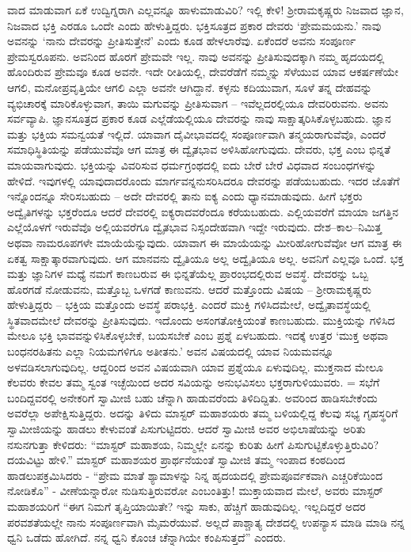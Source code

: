 ವಾದ ಮಾಡುವಾಗ ಏಕೆ ಉದ್ವಿಗ್ನರಾಗಿ ಎಲ್ಲವನ್ನೂ ಹಾಳುಮಾಡುವಿರಿ? ಇಲ್ಲಿ ಕೇಳಿ! ಶ‍್ರೀರಾಮಕೃಷ್ಣರು ನಿಜವಾದ ಜ್ಞಾನ, ನಿಜವಾದ ಭಕ್ತಿ ಎರಡೂ ಒಂದೇ ಎಂದು ಹೇಳುತ್ತಿದ್ದರು. ಭಕ್ತಿಸೂತ್ರದ ಪ್ರಕಾರ ದೇವರು ‘ಪ್ರೇಮಮಯನು.’ ನಾವು ಅವನನ್ನು ‘ನಾನು ದೇವರನ್ನು ಪ್ರೀತಿಸುತ್ತೇನೆ’ ಎಂದು ಕೂಡ ಹೇಳಲಾರೆವು. ಏಕೆಂದರೆ ಅವನು ಸಂಪೂರ್ಣ ಪ್ರೇಮಸ್ವರೂಪನು. ಅವನಿಂದ ಹೊರಗೆ ಪ್ರೇಮವೇ ಇಲ್ಲ. ನಾವು ಅವನನ್ನು ಪ್ರೀತಿಸುವುದಕ್ಕಾಗಿ ನಮ್ಮ ಹೃದಯದಲ್ಲಿ ಹೊಂದಿರುವ ಪ್ರೇಮವೂ ಕೂಡ ಅವನೇ. ಇದೇ ರೀತಿಯಲ್ಲಿ, ದೇವರೆಡೆಗೆ ನಮ್ಮನ್ನು ಸೆಳೆಯುವ ಯಾವ ಆಕರ್ಷಣೆಯೇ ಆಗಲಿ, ಮನೋಪ್ರವೃತ್ತಿಯೇ ಆಗಲಿ ಎಲ್ಲಾ ಅವನೇ ಆಗಿದ್ದಾನೆ. ಕಳ್ಳನು ಕದಿಯುವಾಗ, ಸೂಳೆ ತನ್ನ ದೇಹವನ್ನು ವ್ಯಭಿಚಾರಕ್ಕೆ ಮಾರಿಕೊಳ್ಳುವಾಗ, ತಾಯಿ ಮಗುವನ್ನು ಪ್ರೀತಿಸುವಾಗ – ಇವೆಲ್ಲದರಲ್ಲಿಯೂ ದೇವರಿರುವನು. ಅವನು ಸರ್ವವ್ಯಾಪಿ. ಜ್ಞಾನಸೂತ್ರದ ಪ್ರಕಾರ ಕೂಡ ಎಲ್ಲೆಡೆಯಲ್ಲಿಯೂ ದೇವರನ್ನು ನಾವು ಸಾಕ್ಷಾತ್ಕರಿಸಿಕೊಳ್ಳಬಹುದು. ಜ್ಞಾನ ಮತ್ತು ಭಕ್ತಿಯ ಸಮನ್ವಯತೆ ಇಲ್ಲಿದೆ. ಯಾವಾಗ ದೈವೀಭಾವದಲ್ಲಿ ಸಂಪೂರ್ಣವಾಗಿ ತನ್ಮಯರಾಗುವೆವೊ, ಎಂದರೆ ಸಮಾಧಿಸ್ಥಿತಿಯನ್ನು ಪಡೆಯುವೆವೊ ಆಗ ಮಾತ್ರ ಈ ದ್ವೈತಭಾವ ಅಳಿಸಿಹೋಗುವುದು. ದೇವರು, ಭಕ್ತ ಎಂಬ ಭಿನ್ನತೆ ಮಾಯವಾಗುವುದು. ಭಕ್ತಿಯನ್ನು ವಿವರಿಸುವ ಧರ್ಮಗ್ರಂಥದಲ್ಲಿ ಐದು ಬೇರೆ ಬೇರೆ ವಿಧವಾದ ಸಂಬಂಧಗಳನ್ನು ಹೇಳಿದೆ. ಇವುಗಳಲ್ಲಿ ಯಾವುದಾದರೊಂದು ಮಾರ್ಗವನ್ನನುಸರಿಸಿದರೂ ದೇವರನ್ನು ಪಡೆಯಬಹುದು. ಇದರ ಜೊತೆಗೆ ಇನ್ನೊಂದನ್ನೂ ಸೇರಿಸಬಹುದು – ಅದೇ ದೇವರಲ್ಲಿ ತಾನು ಐಕ್ಯ ಎಂದು ಧ್ಯಾನಮಾಡುವುದು. ಹೀಗೆ ಭಕ್ತರು ಅದ್ವೈತಿಗಳನ್ನು ಭಕ್ತರೆಂದೂ ಆದರೆ ದೇವರಲ್ಲಿ ಐಕ್ಯರಾದವರೆಂದೂ ಕರೆಯಬಹುದು. ಎಲ್ಲಿಯವರೆಗೆ ಮಾಯಾ ಜಗತ್ತಿನ ಎಲ್ಲೆಯೊಳಗೆ ಇರುವೆವೊ ಅಲ್ಲಿಯವರೆಗೂ ದ್ವೈತಭಾವ ನಿಸ್ಸಂದೇಹವಾಗಿ ಇದ್ದೇ ಇರುವುದು. ದೇಶ–ಕಾಲ–ನಿಮಿತ್ತ ಅಥವಾ ನಾಮರೂಪಗಳೇ ಮಾಯೆಯೆನ್ನುವುದು. ಯಾವಾಗ ಈ ಮಾಯೆಯನ್ನು ಮೀರಿಹೋಗುವೆವೋ ಆಗ ಮಾತ್ರ ಈ ಏಕತ್ವ ಸಾಕ್ಷಾತ್ಕಾರವಾಗುವುದು. ಆಗ ಮಾನವನು ದ್ವೈತಿಯೂ ಅಲ್ಲ ಅದ್ವೈತಿಯೂ ಅಲ್ಲ. ಅವನಿಗೆ ಎಲ್ಲವೂ ಒಂದೆ. ಭಕ್ತ ಮತ್ತು ಜ್ಞಾನಿಗಳ ಮಧ್ಯೆ ನಮಗೆ ಕಾಣಬರುವ ಈ ಭಿನ್ನತೆಯೆಲ್ಲ ಪ್ರಾರಂಭದಲ್ಲಿರುವ ಅವಸ್ಥೆ. ದೇವರನ್ನು ಒಬ್ಬ ಹೊರಗಡೆ ನೋಡುವನು, ಮತ್ತೊಬ್ಬ ಒಳಗಡೆ ಕಾಣುವನು. ಆದರೆ ಮತ್ತೊಂದು ವಿಷಯ – ಶ‍್ರೀರಾಮಕೃಷ್ಣರು ಹೇಳುತ್ತಿದ್ದರು – ಭಕ್ತಿಯ ಮತ್ತೊಂದು ಅವಸ್ಥೆ ಪರಾಭಕ್ತಿ. ಎಂದರೆ ಮುಕ್ತಿ ಗಳಿಸಿದಮೇಲೆ, ಅದ್ವೈತಾವಸ್ಥೆಯಲ್ಲಿ ಸ್ಥಿತವಾದಮೇಲೆ ದೇವರನ್ನು ಪ್ರೀತಿಸುವುದು. ಇದೊಂದು ಅಸಂಗತೋಕ್ತಿಯಂತೆ ಕಾಣಬಹುದು. ಮುಕ್ತಿಯನ್ನು ಗಳಿಸಿದ ಮೇಲೂ ಭಕ್ತಿ ಭಾವವನ್ನುಳಿಸಿಕೊಳ್ಳಬೇಕೆ, ಬಯಸಬೇಕೆ ಎಂಬ ಪ್ರಶ್ನೆ ಏಳಬಹುದು. ಇದಕ್ಕೆ ಉತ್ತರ ‘ಮುಕ್ತ ಅಥವಾ ಬಂಧನರಹಿತನು ಎಲ್ಲಾ ನಿಯಮಗಳಿಗೂ ಅತೀತನು.’ ಅವನ ವಿಷಯದಲ್ಲಿ ಯಾವ ನಿಯಮವನ್ನೂ ಅಳವಡಿಸಲಾಗುವುದಿಲ್ಲ. ಆದ್ದರಿಂದ ಅವನ ವಿಷಯವಾಗಿ ಯಾವ ಪ್ರಶ್ನೆಯೂ ಏಳುವುದಿಲ್ಲ. ಮುಕ್ತನಾದ ಮೇಲೂ ಕೆಲವರು ಕೇವಲ ತಮ್ಮ ಸ್ವಂತ ಇಚ್ಛೆಯಿಂದ ಅದರ ಸವಿಯನ್ನು ಅನುಭವಿಸಲು ಭಕ್ತರಾಗುಳಿಯುವರು.
=
ಸಭೆಗೆ ಬಂದಿದ್ದವರಲ್ಲಿ ಅನೇಕರಿಗೆ ಸ್ವಾಮೀಜಿ ಬಹು ಚೆನ್ನಾಗಿ ಹಾಡುವರೆಂದು ತಿಳಿದಿದ್ದಿತು. ಅವರಿಂದ ಹಾಡಿಸಬೇಕೆಂದು ಅವರೆಲ್ಲಾ ಅಪೇಕ್ಷಿಸುತ್ತಿದ್ದರು. ಅದನ್ನು ತಿಳಿದು ಮಾಸ್ಟರ್ ಮಹಾಶಯರು ತಮ್ಮ ಬಳಿಯಲ್ಲಿದ್ದ ಕೆಲವು ಸಭ್ಯ ಗೃಹಸ್ಥರಿಗೆ ಸ್ವಾಮೀಜಿಯನ್ನು ಹಾಡಲು ಕೇಳುವಂತೆ ಪಿಸುಗುಟ್ಟಿದರು. ಆದರೆ ಸ್ವಾಮೀಜಿ ಅವರ ಅಭಿಲಾಷೆಯನ್ನು ಅರಿತು ನಸುನಗುತ್ತಾ ಕೇಳಿದರು: “ಮಾಸ್ಟರ್ ಮಹಾಶಯ, ನಿಮ್ಮಲ್ಲೇ ಏನನ್ನು ಕುರಿತು ಹೀಗೆ ಪಿಸುಗುಟ್ಟಿಕೊಳ್ಳುತ್ತಿರುವಿರಿ? ದಯವಿಟ್ಟು ಹೇಳಿ.” ಮಾಸ್ಟರ್ ಮಹಾಶಯರ ಪ್ರಾರ್ಥನೆಯಂತೆ ಸ್ವಾಮೀಜಿ ತಮ್ಮ ಇಂಪಾದ ಕಂಠದಿಂದ ಹಾಡಲುಪಕ್ರಮಿಸಿದರು - “ಪ್ರೇಮ ಮಾತೆ ಶ್ಯಾಮಾಳನ್ನು ನಿನ್ನ ಹೃದಯದಲ್ಲಿ ಪ್ರೇಮಪೂರ್ವಕವಾಗಿ ಎಚ್ಚರಿಕೆಯಿಂದ ನೋಡಿಕೊ” - ವೀಣೆಯನ್ನಾರೋ ನುಡಿಸುತ್ತಿರುವರೋ ಎಂಬಂತಿತ್ತು! ಮುಕ್ತಾಯವಾದ ಮೇಲೆ, ಅವರು ಮಾಸ್ಟರ್ ಮಹಾಶಯರಿಗೆ “ಈಗ ನಿಮಗೆ ತೃಪ್ತಿಯಾಯಿತೇ? ಇನ್ನು ಸಾಕು, ಹೆಚ್ಚಿಗೆ ಹಾಡುವುದಿಲ್ಲ. ಇಲ್ಲದಿದ್ದರೆ ಅದರ ಪರವಶತೆಯಲ್ಲೇ ನಾನು ಸಂಪೂರ್ಣವಾಗಿ ಮೈಮರೆಯುವೆ. ಅಲ್ಲದೆ ಪಾಶ್ಚಾತ್ಯ ದೇಶದಲ್ಲಿ ಉಪನ್ಯಾಸ ಮಾಡಿ ಮಾಡಿ ನನ್ನ ಧ್ವನಿ ಒಡೆದು ಹೋಗಿದೆ. ನನ್ನ ಧ್ವನಿ ಕೊಂಚ ಚೆನ್ನಾಗಿಯೇ ಕಂಪಿಸುತ್ತದೆ” ಎಂದರು.

